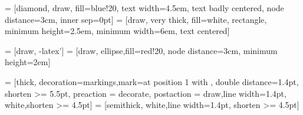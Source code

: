 
\usepackage[english]{babel} 
\usepackage{amsthm} 


\usepackage{algorithm}
\usepackage{algorithmic}
\usepackage{amssymb}
\usepackage{graphicx}
\usepackage{wrapfig}
\usepackage{blkarray, bigstrut}
\usepackage{bm}
\usepackage{ stmaryrd } 

\usepackage{romannum}

\usepackage[normalem]{ulem}
\usepackage{mathpartir}
\usepackage{color}
\usepackage{subcaption} %
\usepackage{mathtools}
\DeclarePairedDelimiter{\ceil}{\lceil}{\rceil}
\DeclarePairedDelimiter{\floor}{\lfloor}{\rfloor}
\usepackage{fourier} 
\usepackage{tikz}
\usetikzlibrary{shapes,arrows,snakes,decorations.markings}
\usetikzlibrary{svg.path,arrows.meta, calc} 

 = [diamond, draw, fill=blue!20, 
    text width=4.5em, text badly centered, node distance=3cm, inner sep=0pt]
 = [draw, very thick, fill=white, rectangle, 
    minimum height=2.5em, minimum width=6em, text centered]

 = [draw, -latex']
 = [draw, ellipse,fill=red!20, node distance=3cm,    minimum height=2em]

 = [thick, decoration={markings,mark=at position
   1 with {}},
   double distance=1.4pt, shorten >= 5.5pt,
   preaction = {decorate},
   postaction = {draw,line width=1.4pt, white,shorten >= 4.5pt}]
 = [semithick, white,line width=1.4pt, shorten >= 4.5pt]

\usepackage{multirow}


\usepackage{listings}
\usepackage{xcolor}
\usepackage{courier}


\lstset{style=mystyle}



